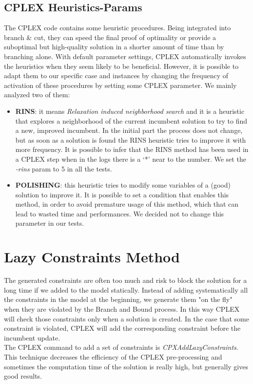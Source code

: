 \subsection{CPLEX Heuristics-Params}
The \textsc{CPLEX} code contains some heuristic procedures. Being integrated into branch \& cut, they can speed the final proof of optimality or provide a suboptimal but high-quality solution in a shorter amount of time than by branching alone. With default parameter settings, \textsc{CPLEX} automatically invokes the heuristics when they seem likely to be beneficial. However, it is possible to adapt them to our specific case and instances by changing the frequency of activation of these procedures by setting some \textsc{CPLEX} parameter. We mainly analyzed two of them:
\begin{itemize}
\setlength{\parskip}{0pt}
\setlength{\itemsep}{0pt plus 1pt}
\item \textbf{RINS}: it means \textit{Relaxation induced neighborhood search} and it is a heuristic that explores a neighborhood of the current incumbent solution to try to find a new, improved incumbent. In the initial part the process does not change, but as soon as a solution is found the RINS heuristic tries to improve it with more frequency. It is possible to infer that the RINS method has been used in a \textsc{CPLEX} step when in the logs there is a ‘*’ near to the number. We set the \textit{-rins} param to 5 in all the tests. 
\item \textbf{POLISHING}: this heuristic tries to modify some variables of a (good) solution to improve it. It is possible to set a condition that enables this method, in order to avoid premature usage of this method, which that can lead to wasted time and performances. We decided not to change this parameter in our tests.
\end{itemize}

\section{Lazy Constraints Method}
The generated constraints are often too much and risk to block the solution for a long time if we added to the model statically.  
Instead of adding systematically all the constraints in the model at the beginning, we generate them "on the fly" when they are violated by the Branch and Bound process. In this way \textsc{CPLEX} will check those constraints only when a solution is created. In the case that some constraint is violated, \textsc{CPLEX} will add the corresponding constraint before the incumbent update. \\
The \textsc{CPLEX} command to add a set of constraints is \textit{CPXAddLazyConstraints}. \\
This technique decreases the efficiency of the \textsc{CPLEX} pre-processing and sometimes the computation time of the solution is really high, but generally gives good results.

